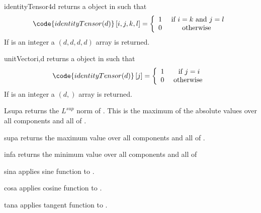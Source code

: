 \begin{funcdesc}{identityTensor4}{d}
returns a \RankFour \Data object in \FunctionSpace {} such that
\begin{equation}
\code{identityTensor(d)}\left[ i,j,k,l\right] = \left\{ 
\begin{array}{cc}
1 & \mbox{ if } i=k \mbox{ and } j=l\\
0 & \mbox{ otherwise }
\end{array}
\right.
\end{equation}
If  is an integer a $(d,d,d,d)$ \numarray array is returned.
\end{funcdesc}
\begin{funcdesc}{unitVector}{i,d}
returns a \RankOne \Data object in \FunctionSpace {} such that
\begin{equation}
\code{identityTensor(d)}\left[ j \right] = \left\{ 
\begin{array}{cc}
1 & \mbox{ if } j=i\\
0 & \mbox{ otherwise }
\end{array}
\right.
\end{equation}
If  is an integer a $(d,)$ \numarray array is returned.

\end{funcdesc}

\begin{funcdesc}{Lsup}{a}
returns the $L^{sup}$ norm of . This is the maximum of the absolute values
 over all components and all \DataSamplePoints of . 
\end{funcdesc}

\begin{funcdesc}{sup}{a}
returns the maximum value over all components and all \DataSamplePoints of .
\end{funcdesc}

\begin{funcdesc}{inf}{a}
returns the minimum value over all components and all \DataSamplePoints of 
\end{funcdesc}

\begin{funcdesc}{sin}{a}
applies sine function to .
\end{funcdesc}

\begin{funcdesc}{cos}{a}
applies cosine function to .
\end{funcdesc}

\begin{funcdesc}{tan}{a}
applies tangent function to .
\end{funcdesc}

